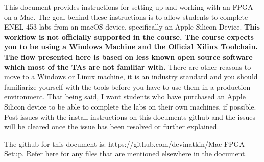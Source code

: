 This document provides instructions for setting up and working with an FPGA on a Mac. 
The goal behind these instructions is to allow students to complete ENEL 453 labs from an macOS device, specifically an Apple Silicon Device.
\textbf{This workflow is not officially supported in the course. 
The course expects you to be using a Windows Machine and the Official Xilinx Toolchain. 
The flow presented here is based on less known open source software which most of the TAs are not familiar with.} 
There are other reasons to move to a Windows or Linux machine, it is an industry standard and you should familiarize yourself with the tools before you have to use them in a production environment. 
That being said, I want students who have purchased an Apple Silicon device to be able to complete the labs on their own machines, if possible.
Post issues with the install instructions on this documents github and the issues will be cleared once the issue has been resolved or further explained.


The github for this document is: https://github.com/devinatkin/Mac-FPGA-Setup. Refer here for any files that are mentioned elsewhere in the document. 